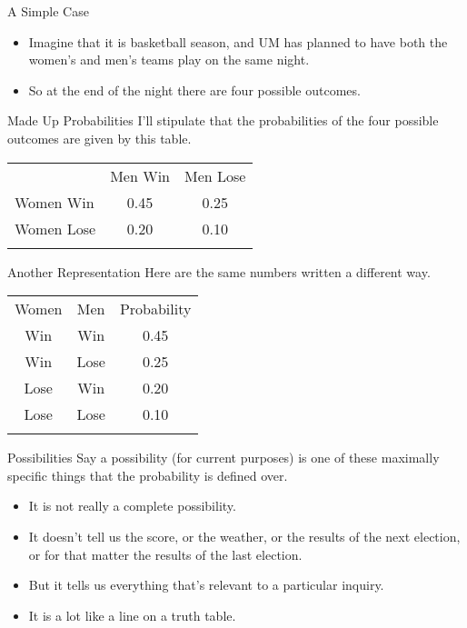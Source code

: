 \documentclass[
  ignorenonframetext,
]{beamer}
\providecommand{\tightlist}{%
  \setlength{\itemsep}{0pt}\setlength{\parskip}{0pt}}
\renewcommand{\,}{\text{, }}
\begin{document}
\begin{frame}{A Simple Case}
\protect\hypertarget{a-simple-case}{}
\begin{itemize}
\tightlist
\item
  Imagine that it is basketball season, and UM has planned to have both
  the women's and men's teams play on the same night.
\item
  So at the end of the night there are four possible outcomes.
\end{itemize}
\end{frame}

\begin{frame}{Made Up Probabilities}
\protect\hypertarget{made-up-probabilities}{}
I'll stipulate that the probabilities of the four possible outcomes are
given by this table.

\begin{longtable}[]{@{}lcc@{}}
\toprule
& Men Win & Men Lose \\ \addlinespace
\midrule
\endhead
Women Win & 0.45 & 0.25 \\ \addlinespace
Women Lose & 0.20 & 0.10 \\ \addlinespace
\bottomrule
\end{longtable}
\end{frame}

\begin{frame}{Another Representation}
\protect\hypertarget{another-representation}{}
Here are the same numbers written a different way.

\begin{longtable}[]{@{}ccc@{}}
\toprule
Women & Men & Probability \\ \addlinespace
\midrule
\endhead
Win & Win & 0.45 \\ \addlinespace
Win & Lose & 0.25 \\ \addlinespace
Lose & Win & 0.20 \\ \addlinespace
Lose & Lose & 0.10 \\ \addlinespace
\bottomrule
\end{longtable}
\end{frame}

\begin{frame}{Possibilities}
\protect\hypertarget{possibilities}{}
Say a possibility (for current purposes) is one of these maximally
specific things that the probability is defined over.

\begin{itemize}
\tightlist
\item
  It is not really a complete possibility.
\item
  It doesn't tell us the score, or the weather, or the results of the
  next election, or for that matter the results of the last election.
\item
  But it tells us everything that's relevant to a particular inquiry.
\item
  It is a lot like a line on a truth table.
\end{itemize}
\end{frame}
\end{document}
